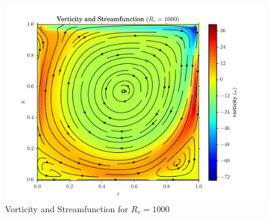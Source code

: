 \documentclass[addpoints]{exam}
\begin{document}
\begin{questions}
\begin{solution}
\begin{figure}[H]
\centering
\includegraphics[width=.75\textwidth]{figs/vorticity_streamfunction_1000.pdf}
\caption{Vorticity and Streamfunction for $R_{e}=1000$}
\label{fig:vorticity_streamfunction_re1000}
\end{figure}


\end{solution}
\end{questions}
\end{document}
